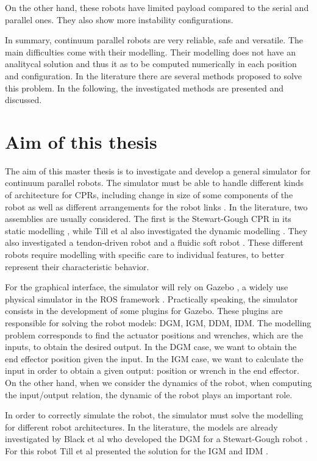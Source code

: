 \documentclass{thesisreport}
\begin{document}
 On the other hand, these robots have limited payload compared to the serial and parallel ones. They also show more instability configurations.
 
 In summary, continuum parallel robots are very reliable, safe and versatile. The main difficulties come with their modelling. Their modelling does not have an analitycal solution and thus it as to be computed numerically in each position and configuration. In the literature there are several methods proposed to solve this problem. In the following, the investigated methods are presented and discussed.
 
 \section{Aim of this thesis}
 The aim of this master thesis is to investigate and develop a general simulator for continuum parallel robots. The simulator must be able to handle different kinds of architecture for CPRs, including change in size of some components of the robot as well as different arrangements for the robot links \cite{bryson_toward_2014}. In the literature, two assemblies are usually considered. The first is the Stewart-Gough CPR in its static modelling \cite{till_efficient_2015}\cite{black_parallel_2018}, while Till et al also investigated the dynamic modelling \cite{till_real-time_2019}. They also investigated a tendon-driven robot and a fluidic soft robot \cite{till_real-time_2019}. These different robots require modelling with specific care to individual features, to better represent their characteristic behavior. 
 
 For the graphical interface, the simulator will rely on Gazebo \cite{koenig_design_2004}\cite{noauthor_gazebo_nodate}, a widely use physical simulator in the ROS framework \cite{noauthor_rosorg_nodate}. Practically speaking, the simulator consists in the development of some plugins for Gazebo. These plugins are responsible for solving the robot models: DGM, IGM, DDM, IDM.
  The modelling problem corresponds to find the actuator positions and wrenches, which are the inputs, to obtain the desired output. In the DGM case, we want to obtain the end effector position given the input. In the IGM case, we want to calculate the input in order to obtain a given output: position or wrench in the end effector. On the other hand, when we consider the dynamics of the robot, when computing the input/output relation, the dynamic of the robot plays an important role. 
 
 In order to correctly simulate the robot, the simulator must solve the modelling for different robot architectures. In the literature, the models are already investigated by Black et al who developed the DGM for a Stewart-Gough robot \cite{black_parallel_2018}. For this robot Till et al presented the solution for the IGM \cite{till_real-time_2019} and IDM \cite{till_efficient_2015}.
 
\end{document}
